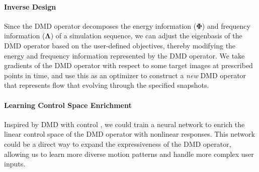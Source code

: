 \paragraph{Inverse Design}
Since the DMD operator decomposes the energy information ($\bm{\Phi}$) and frequency information ($\bm{\Lambda}$) of a simulation sequence, we can adjust the eigenbasis of the DMD operator based on the user-defined objectives, thereby modifying the energy and frequency information represented by the DMD operator. We take gradients of the DMD operator with respect to some target images at prescribed points in time, and use this as an optimizer to construct a \emph{new} DMD operator that represents flow that evolving through the specified snapshots.
\paragraph{Learning Control Space Enrichment}
Inspired by DMD with control \cite{proctor2016dynamic}, we could train a neural network to enrich the linear control space of the DMD operator with nonlinear responses. This network could be a direct way to expand the expressiveness of the DMD operator, allowing us to learn more diverse motion patterns and handle more complex user inputs.